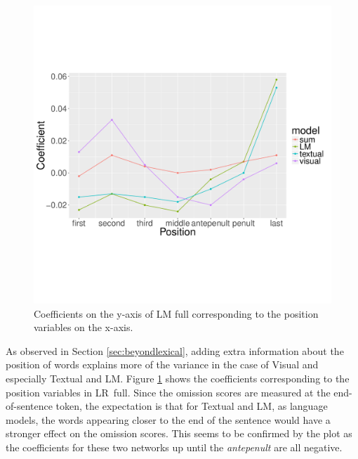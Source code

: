 \begin{figure}
\centering
 \includegraphics[scale=0.4]{position-coef.pdf}
 \caption{Coefficients on the y-axis of {\sc LM full} corresponding to the
position variables on the x-axis.}
 \label{fig:posrqs}
\end{figure}
 
As observed in Section \ref{sec:beyondlexical}, 
adding extra information about the position of words 
explains more of the variance in the case of {\sc Visual} and especially
{\sc Textual} and {\sc LM}.
Figure \ref{fig:posrqs} shows the coefficients corresponding to the
position variables in {\sc LR~full}. Since the omission scores 
are measured at the end-of-sentence token, the expectation is that 
for {\sc Textual} and {\sc LM}, as language models,  
the words appearing closer to the end of the sentence would have a
stronger effect on the omission scores. This seems to be confirmed by
the plot as the coefficients for these two networks up until the
\emph{antepenult} are all negative. 


